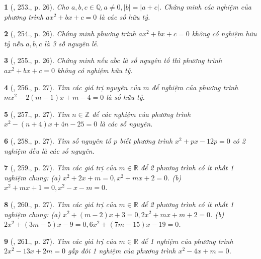 \documentclass{article}
\newtheorem{baitoan}{}
\begin{document}
\begin{baitoan}[\cite{Binh_Toan_9_tap_2}, 253., p. 26]
	Cho $a,b,c\in\mathbb{Q},a\ne0,|b| = |a + c|$. Chứng minh các nghiệm của phương trình $ax^2 + bx + c = 0$ là các số hữu tỷ.
\end{baitoan}

\begin{baitoan}[\cite{Binh_Toan_9_tap_2}, 254., p. 26]
	Chứng minh phương trình $ax^2 + bx + c = 0$ không có nghiệm hữu tỷ nếu $a,b,c$ là 3 số nguyên lẻ.
\end{baitoan}

\begin{baitoan}[\cite{Binh_Toan_9_tap_2}, 255., p. 26]
	Chứng minh nếu $\overline{abc}$ là số nguyên tố thì phương trình $ax^2 + bx + c = 0$ không có nghiệm hữu tỷ.
\end{baitoan}

\begin{baitoan}[\cite{Binh_Toan_9_tap_2}, 256., p. 27]
	Tìm các giá trị nguyên của $m$ để nghiệm của phương trình $mx^2 - 2(m - 1)x + m - 4 = 0$ là số hữu tỷ.
\end{baitoan}

\begin{baitoan}[\cite{Binh_Toan_9_tap_2}, 257., p. 27]
	Tìm $n\in\mathbb{Z}$ để các nghiệm của phương trình $x^2 - (n + 4)x + 4n - 25 = 0$ là các số nguyên.
\end{baitoan}

\begin{baitoan}[\cite{Binh_Toan_9_tap_2}, 258., p. 27]
	Tìm số nguyên tố $p$ biết phương trình $x^2 + px - 12p = 0$ có 2 nghiệm đều là các số nguyên.
\end{baitoan}

\begin{baitoan}[\cite{Binh_Toan_9_tap_2}, 259., p. 27]
	Tìm các giá trị của $m\in\mathbb{R}$ để 2 phương trình có ít nhất 1 nghiệm chung: (a) $x^2 + 2x + m = 0,x^2 + mx + 2 = 0$. (b) $x^2 + mx + 1 = 0,x^2 - x - m = 0$.
\end{baitoan}

\begin{baitoan}[\cite{Binh_Toan_9_tap_2}, 260., p. 27]
	Tìm các giá trị của $m\in\mathbb{R}$ để 2 phương trình có ít nhất 1 nghiệm chung: (a) $x^2 + (m - 2)x + 3 = 0,2x^2 + mx + m + 2 = 0$. (b) $2x^2 + (3m - 5)x - 9 = 0,6x^2 + (7m - 15)x - 19 = 0$.
\end{baitoan}

\begin{baitoan}[\cite{Binh_Toan_9_tap_2}, 261., p. 27]
	Tìm các giá trị của $m\in\mathbb{R}$ để 1 nghiệm của phương trình $2x^2 - 13x + 2m = 0$ gấp đôi 1 nghiệm của phương trình $x^2 - 4x + m = 0$.
\end{baitoan}
\end{document}
